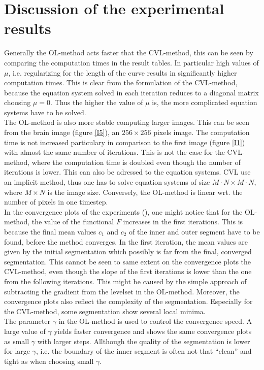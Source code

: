 \section{Discussion of the experimental results}
Generally the OL-method acts faster that the CVL-method, this can be seen by comparing the computation times in the result tables. In particular high values of $\mu$, i.e. regularizing for the length of the curve results in significantly higher computation times. This is clear from the formulation of the CVL-method, because the equation system solved in each iteration reduces to a diagonal matrix choosing $\mu=0$. Thus the higher the value of $\mu$ is, the more complicated equation systems have to be solved.\\
The OL-method is also more stable computing larger images. This can be seen from the brain image (figure \ref{I5}), an $256\times 256$ pixels image. The computation time is not increased particulary in comparison to the first image (figure \ref{I1}) with almost the same number of iterations. This is not the case for the CVL-method, where the computation time is doubled even though the number of iterations is lower. This can also be adressed to the equation systems. CVL use an implicit method, thus one has to solve equation systems of size $M\cdot N\times M\cdot N$, where $M\times N$ is the image size. Conversely, the OL-method is linear wrt. the number of pixels in one timestep.\\
In the convergence plots of the experiments (), one might notice that for the OL-method, the value of the functional $F$ increases in the first iterations. This is because the final mean values $c_1$ and $c_2$ of the inner and outer segment have to be found, before the method converges. In the first iteration, the mean values are given by the initial segmentation which possibly is far from the final, converged segmentation. This cannot be seen to same extent on the convergence plots the CVL-method, even though the slope of the first iterations is lower than the one from the following iterations. This might be caused by the simple approach of subtracting the gradient from the levelset in the OL-method. Moreover, the convergence plots also reflect the complexity of the segmentation. Especially for the CVL-method, some segmentation show several local minima.\\
The parameter $\gamma$ in the OL-method is used to control the convergence speed. A large value of $\gamma$ yields faster convergence and shows the same convergence plots as small $\gamma$ with larger steps. Allthough the quality of the segmentation is lower for large $\gamma$, i.e. the boundary of the inner segment is often not that ``clean'' and tight as when choosing small $\gamma$.\\ 
